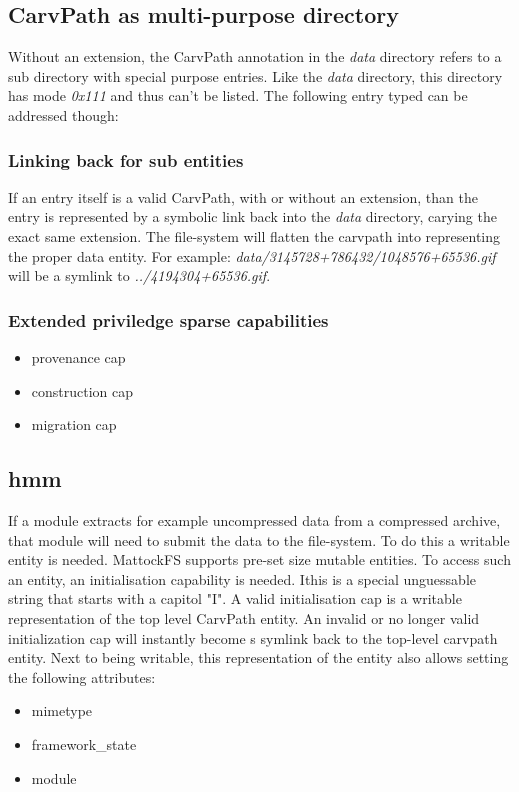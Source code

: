 \begin{itemize}
\begin{itemize}
\begin{itemize}
\begin{itemize}
\subsection{CarvPath as multi-purpose directory}
Without an extension, the CarvPath annotation in the \emph{data} directory refers to a sub directory with special purpose entries. Like the \emph{data} directory, this directory has mode \emph{0x111} and thus can't be listed. The following entry typed can be addressed though:
\subsubsection{Linking back for sub entities}
If an entry itself is a valid CarvPath, with or without an extension, than the entry is represented by a symbolic link back into the \emph{data} directory, carying the exact same extension. The file-system will flatten the carvpath into representing the proper data entity. For example: \emph{data/3145728+786432/1048576+65536.gif} will be a symlink to \emph{../4194304+65536.gif}.
\subsubsection{Extended priviledge sparse capabilities}
\begin{itemize}
\item provenance cap
\item construction cap
\item migration cap
\end{itemize}
\subsection{hmm}
If a module extracts for example uncompressed data from a compressed archive, that module will need to submit the data to the file-system. To do this a writable entity is needed. MattockFS supports pre-set size mutable entities. To access such an entity, an initialisation capability is needed. Ithis is a special unguessable string that starts with a capitol "I". A valid initialisation cap is a writable representation of the top level CarvPath entity. An invalid or no longer valid initialization cap will instantly become s symlink back to the top-level carvpath entity. Next to being writable, this representation of the entity also allows setting the following attributes:
\begin{itemize}
\item mimetype
\item framework\_state
\item module
\end{itemize}

\end{itemize}
\end{itemize}
\end{itemize}
\end{itemize}
